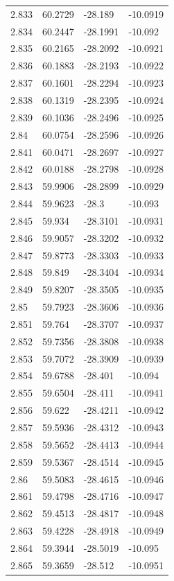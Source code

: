\begin{tabular}{llll}
2.833 & 60.2729 & -28.189 & -10.0919 \\
2.834 & 60.2447 & -28.1991 & -10.092 \\
2.835 & 60.2165 & -28.2092 & -10.0921 \\
2.836 & 60.1883 & -28.2193 & -10.0922 \\
2.837 & 60.1601 & -28.2294 & -10.0923 \\
2.838 & 60.1319 & -28.2395 & -10.0924 \\
2.839 & 60.1036 & -28.2496 & -10.0925 \\
2.84 & 60.0754 & -28.2596 & -10.0926 \\
2.841 & 60.0471 & -28.2697 & -10.0927 \\
2.842 & 60.0188 & -28.2798 & -10.0928 \\
2.843 & 59.9906 & -28.2899 & -10.0929 \\
2.844 & 59.9623 & -28.3 & -10.093 \\
2.845 & 59.934 & -28.3101 & -10.0931 \\
2.846 & 59.9057 & -28.3202 & -10.0932 \\
2.847 & 59.8773 & -28.3303 & -10.0933 \\
2.848 & 59.849 & -28.3404 & -10.0934 \\
2.849 & 59.8207 & -28.3505 & -10.0935 \\
2.85 & 59.7923 & -28.3606 & -10.0936 \\
2.851 & 59.764 & -28.3707 & -10.0937 \\
2.852 & 59.7356 & -28.3808 & -10.0938 \\
2.853 & 59.7072 & -28.3909 & -10.0939 \\
2.854 & 59.6788 & -28.401 & -10.094 \\
2.855 & 59.6504 & -28.411 & -10.0941 \\
2.856 & 59.622 & -28.4211 & -10.0942 \\
2.857 & 59.5936 & -28.4312 & -10.0943 \\
2.858 & 59.5652 & -28.4413 & -10.0944 \\
2.859 & 59.5367 & -28.4514 & -10.0945 \\
2.86 & 59.5083 & -28.4615 & -10.0946 \\
2.861 & 59.4798 & -28.4716 & -10.0947 \\
2.862 & 59.4513 & -28.4817 & -10.0948 \\
2.863 & 59.4228 & -28.4918 & -10.0949 \\
2.864 & 59.3944 & -28.5019 & -10.095 \\
2.865 & 59.3659 & -28.512 & -10.0951 \\

\end{tabular}
